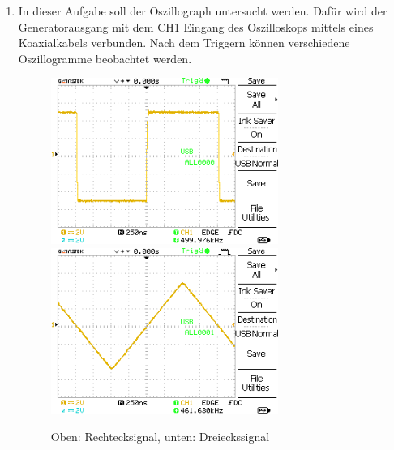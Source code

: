 \documentclass{article}
\begin{document}
     \begin{enumerate}[label=\alph*]
         \item In dieser Aufgabe soll der Oszillograph untersucht werden. Dafür wird der Generatorausgang mit dem CH1 Eingang des Oszilloskops mittels eines Koaxialkabels verbunden. Nach dem Triggern können verschiedene Oszillogramme beobachtet werden.
         
         \begin{figure}[H]
             \centering
             \includegraphics[width=0.7\textwidth]{MesswerteVersuch0/A0000DS.png}
             \includegraphics[width=0.7\textwidth]{MesswerteVersuch0/A0001DS.png}
             \caption{Oben: Rechtecksignal, unten: Dreieckssignal}
             \label{fig:A0000DS,1}
         \end{figure}
         

\end{enumerate}
\end{document}
